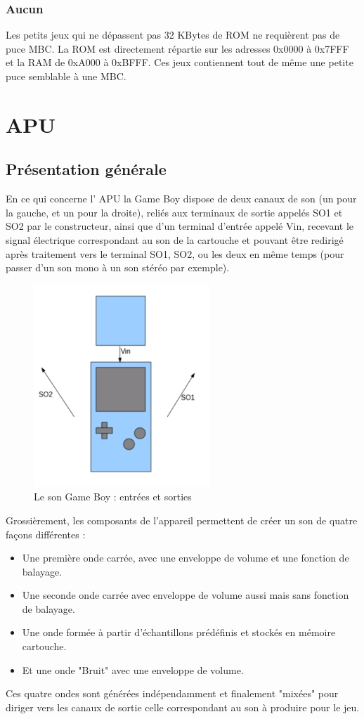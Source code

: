 \documentclass[french]{report}
\begin{document}
\subsubsection{Aucun}
	Les petits jeux qui ne dépassent pas 32 KBytes de ROM ne requièrent pas de puce MBC. La ROM est directement répartie sur les adresses 0x0000 à 0x7FFF et la RAM de 0xA000 à 0xBFFF. Ces jeux contiennent tout de même une petite puce semblable à une MBC.\\

\section{APU}
\subsection{Présentation générale}
	En ce qui concerne l' \gls{APU} la Game Boy dispose de deux canaux de son (un pour la gauche,
	et un pour la droite), reliés aux terminaux de sortie appelés
	SO1 et SO2 par le constructeur, ainsi que d'un terminal
	d'entrée appelé Vin, recevant le signal électrique
	correspondant au son de la cartouche et pouvant être redirigé après
	traitement vers le terminal SO1, SO2, ou les deux en même
	temps (pour passer d'un son mono à un son stéréo par
	exemple).
\begin{figure}[!h]
\centering
\includegraphics[scale=0.5]{images/GBSound1.jpg}
\caption{Le son Game Boy : entrées et sorties}
\label{GBS1}
\end{figure}

	Grossièrement, les composants de l'appareil permettent de
	créer un son de quatre façons différentes : 
		\begin{itemize}
		\item Une première onde carrée, avec une enveloppe de
		volume et une fonction de balayage.
		\item Une seconde onde carrée avec enveloppe de volume
		aussi mais sans fonction de balayage.
		\item Une onde formée à partir d'échantillons
		prédéfinis et stockés en mémoire cartouche.
		\item Et une onde "Bruit" avec une enveloppe de
		volume.
		\end{itemize}
	Ces quatre ondes sont générées indépendamment et finalement
	"mixées" pour diriger vers les canaux de sortie celle
	correspondant au son à produire pour le jeu.
\end{document}
